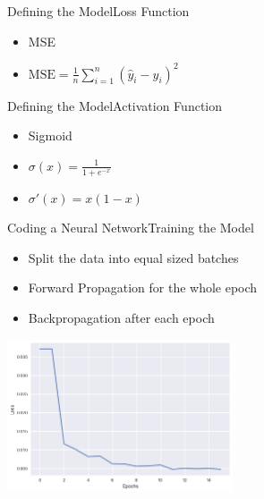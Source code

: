 \documentclass{beamer}
\begin{document}
\begin{frame}{Defining the Model}{Loss Function}
    \begin{itemize}
        \item MSE
        \item $\text{MSE} = \frac{1}{n}\sum_{i=1}^{n}(\hat{y}_i-y_i)^2$
    \end{itemize}
\end{frame}

\begin{frame}{Defining the Model}{Activation Function}
    \begin{itemize}
        \item Sigmoid
        \item $\sigma(x) = \frac{1}{1+e^{-x}}$
        \item $\sigma'(x) = x(1-x)$
    \end{itemize}
\end{frame}

\begin{frame}{Coding a Neural Network}{Training the Model}
\begin{multicols}{2} 
    \begin{itemize}
        \item Split the data into equal sized batches
        \item Forward Propagation for the whole epoch
        \item Backpropagation after each epoch
    \end{itemize}
    \begin{center}
        \includegraphics[width=0.5\textwidth]{images/loss}
    \end{center}
\end{multicols}
\end{frame}
\end{document}
